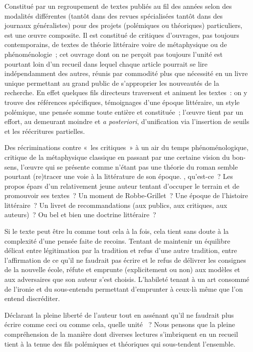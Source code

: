 

Constitué par un regroupement de textes publiés au fil des années selon des modalités différentes (tantôt dans des revues spécialisées tantôt dans des journaux généralistes) pour des projets (polémiques ou théoriques) particuliers, \punr{} est une œuvre composite. Il est constitué de critiques d'ouvrages, pas toujours contemporains, de textes de théorie littéraire voire de métaphysique ou de phénoménologie~; cet ouvrage dont on ne perçoit pas toujours l'unité est pourtant loin d'un recueil dans lequel chaque article pourrait se lire indépendamment des autres, réunis par commodité plus que nécessité en un livre unique permettant au grand public de s'approprier les nouveautés de la recherche. En effet quelques fils directeurs traversent et animent les textes~: on y trouve des références spécifiques, témoignages d'une époque littéraire, un style polémique, une pensée somme toute entière et constituée~; l'œuvre tient par un effort, au demeurant moindre et \textit{a posteriori}, d'unification via l'insertion de seuils et les réécritures partielles.

Des récriminations contre «~les critiques~» à un air du temps phénoménologique, critique de la métaphysique classique en passant par une certaine vision du bon-sens, l'œuvre qui se présente comme n'étant pas une théorie du roman semble pourtant (re)tracer une voie à la littérature de son époque. \punr, qu'est-ce~? Les propos épars d'un relativement jeune auteur tentant d'occuper le terrain et de promouvoir ses textes~? Un moment de Robbe-Grillet~? Une époque de l'histoire littéraire~? Un livret de recommandations (aux publics, aux critiques, aux auteurs)~? Ou bel et bien une doctrine littéraire~?

Si le texte peut être lu comme tout cela à la fois, cela tient sans doute à la complexité d'une pensée faite de recoins. Tentant de maintenir un équilibre délicat entre légitimation par la tradition et refus d'une autre tradition, entre l'affirmation de ce qu'il ne faudrait pas écrire et le refus de délivrer les consignes de la nouvelle école, \punr{} réfute et emprunte (explicitement ou non) aux modèles et aux adversaires que son auteur s'est choisis. L'habileté tenant à un art consommé de l'ironie et du sous-entendu permettant d'emprunter à ceux-là même que l'on entend discréditer.

Déclarant la pleine liberté de l'auteur tout en assénant qu'il ne faudrait plus écrire comme ceci ou comme cela, quelle unité \punr~? Nous pensons que la pleine compréhension de la manière dont diverses lectures s'imbriquent en un recueil tient à la tenue des fils polémiques et théoriques qui sous-tendent l'ensemble. 

